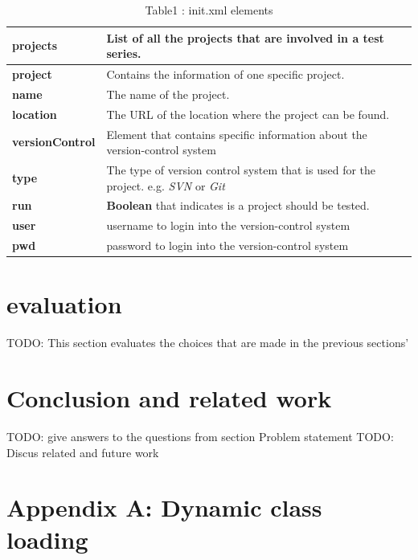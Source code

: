 \documentclass{article}
\begin{document}
\begin{table}
\centering
  \begin{tabular}{ | l| p{5cm} |}
  \hline
  \textbf{projects} & List of all the projects that are involved in a test series. \\ \hline
  \textbf{project} & Contains the information of one specific project. \\ \hline
  \textbf{name} & The name of the project. \\ \hline
  \textbf{location} & The URL of the location where the project can be found. \\ \hline
  \textbf{versionControl} & Element that contains specific information about the version-control system \\ \hline
  \textbf{type} & The type of version control system that is used for the project. e.g. \emph{SVN} or \emph{Git} \\ \hline
  \textbf{run} & \textbf{Boolean} that indicates is a project should be tested. \\ \hline
  \textbf{user} & username to login into the version-control system \\ \hline
  \textbf{pwd} & password to login into the version-control system \\ \hline
  \end{tabular}
\caption{Table1 : init.xml elements}
\label{tab:init}
\end{table}



\newpage
\section{evaluation}
\label{sec:evaluation}
TODO: This section evaluates the choices that are made in the previous sections'

\newpage
\section{Conclusion and related work}
\label{sec:conclusion}
TODO: give answers to the questions from section Problem statement
TODO: Discus related and future work
\newpage


\newpage
\appendix
\section{Appendix A: Dynamic class loading}
\label{AppendixA}
\end{document}
